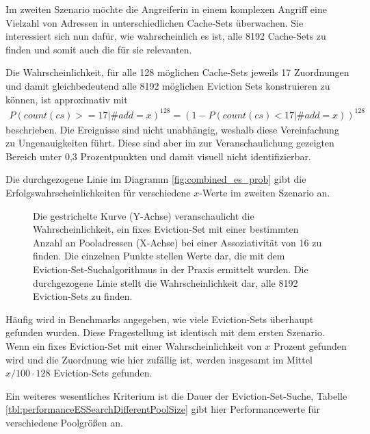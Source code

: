 Im zweiten Szenario möchte die Angreiferin in einem komplexen Angriff eine Vielzahl von Adressen in unterschiedlichen Cache-Sets überwachen. 
Sie interessiert sich nun dafür, wie wahrscheinlich es ist, alle 8192 Cache-Sets zu finden und somit auch die für sie relevanten. 

Die Wahrscheinlichkeit, für alle 128 möglichen Cache-Sets jeweils 17 Zuordnungen und damit gleichbedeutend alle 8192 möglichen Eviction Sets konstruieren zu können, ist approximativ mit
\begin{align*}
P(count(cs)>=17|\#add = x)^{128} = (1-P(count(cs)<17|\#add = x))^{128}
\end{align*}
beschrieben.
Die Ereignisse sind nicht unabhängig, weshalb diese Vereinfachung zu Ungenauigkeiten führt.
Diese sind aber im zur Veranschaulichung gezeigten Bereich unter 0,3 Prozentpunkten und damit visuell nicht identifizierbar.

Die durchgezogene Linie im Diagramm \ref{fig:combined_es_prob} gibt die Erfolgswahrscheinlichkeiten für verschiedene $x$-Werte im zweiten Szenario an. 


\label{fig:combined_es_prob}
\begin{figure}[h]
\centering
\begin{scaletikzpicturetowidth}{\textwidth}

\end{scaletikzpicturetowidth}
\caption{Die gestrichelte Kurve (Y-Achse) veranschaulicht die Wahrscheinlichkeit, ein fixes Eviction-Set mit einer bestimmten Anzahl an Pooladressen (X-Achse) bei einer Assoziativität von 16 zu finden. Die einzelnen Punkte stellen Werte dar, die mit dem Eviction-Set-Suchalgorithmus in der Praxis ermittelt wurden.
Die durchgezogene Linie stellt die Wahrscheinlichkeit dar, alle 8192 Eviction-Sets zu finden.}
\end{figure}

Häufig wird in Benchmarks angegeben, wie viele Eviction-Sets überhaupt gefunden wurden.
Diese Fragestellung ist identisch mit dem ersten Szenario.
Wenn ein fixes Eviction-Set mit einer Wahrscheinlichkeit von $x$ Prozent gefunden wird und die Zuordnung wie hier zufällig ist, werden insgesamt im Mittel $x/100 \cdot 128$ Eviction-Sets gefunden.

Ein weiteres wesentliches Kriterium ist die Dauer der Eviction-Set-Suche, Tabelle \ref{tbl:performanceESSearchDifferentPoolSize} gibt hier Performancewerte für verschiedene Poolgrößen an.

